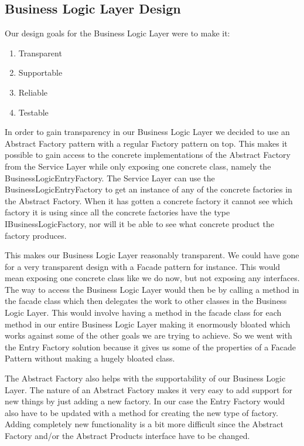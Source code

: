 \documentclass[../report.tex]{subfiles}
\begin{document}
\graphicspath{{img/}{../img/}}

\subsection{Business Logic Layer Design}

Our design goals for the Business Logic Layer were to make it:
\begin{enumerate}
\item Transparent
\item Supportable
\item Reliable
\item Testable
\end{enumerate}

In order to gain transparency in our Business Logic Layer we decided to use an Abstract Factory pattern with a regular Factory pattern on top. This makes it possible to gain access to the concrete implementations of the Abstract Factory from the Service Layer while only exposing one concrete class, namely the BusinessLogicEntryFactory. The Service Layer can use the BusinessLogicEntryFactory to get an instance of any of the concrete factories in the Abstract Factory. When it has gotten a concrete factory it cannot see which factory it is using since all the concrete factories have the type IBusinessLogicFactory, nor will it be able to see what concrete product the factory produces.

This makes our Business Logic Layer reasonably transparent. We could have gone for a very transparent design with a Facade pattern for instance. This would mean exposing one concrete class like we do now, but not exposing any interfaces. The way to access the Business Logic Layer would then be by calling a method in the facade class which then delegates the work to other classes in the Business Logic Layer. This would involve having a method in the facade class for each method in our entire Business Logic Layer making it enormously bloated which works against some of the other goals we are trying to achieve. So we went with the Entry Factory solution because it gives us some of the properties of a Facade Pattern without making a hugely bloated class.

The Abstract Factory also helps with the supportability of our Business Logic Layer. The nature of an Abstract Factory makes it very easy to add support for new things by just adding a new factory. In our case the Entry Factory would also have to be updated with a method for creating the new type of factory. Adding completely new functionality is a bit more difficult since the Abstract Factory and/or the Abstract Products interface have to be changed. 
\end{document}
